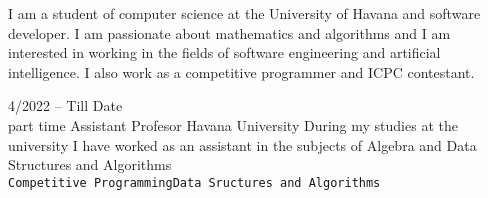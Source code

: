 \documentclass[9pt]{developercv} %
\begin{document}
\vspace{0.5cm}





\begin{minipage}[t]{0.4\textwidth} %
	\vspace{-\baselineskip} %

	I am a student of computer science at the University of Havana and software developer. I am passionate
	about mathematics and algorithms and I am interested in working in the fields of software engineering and
	artificial intelligence. I also work as a competitive programmer and ICPC contestant.
\end{minipage}
\hfill %
\begin{minipage}[t]{0.5\textwidth} %
	\vspace{-\baselineskip} %
	\begin{barchart}{5.5}
	\end{barchart}
\end{minipage}

\begin{center}
\end{center}



\begin{entrylist}
	\entry
	{4/2022 -- Till Date\\\footnotesize{part time}}
	{Assistant Profesor}
	{Havana University}
	{During my studies at the university I have worked as an assistant in the subjects of Algebra
		and Data Structures and Algorithms\\ \texttt{Competitive Programming}\slashsep\texttt{Data Sructures and Algorithms}}
\end{entrylist}
\end{document}
